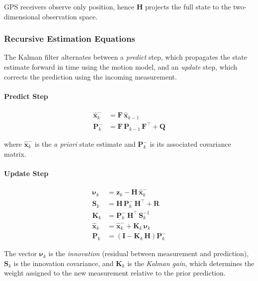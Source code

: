 \documentclass[12pt, a4paper]{article}
\begin{document}
GPS receivers observe only position, hence $\mathbf{H}$ projects the full
state to the two-dimensional observation space.

\subsubsection{Recursive Estimation Equations}

The Kalman filter alternates between a \emph{predict} step, which propagates
the state estimate forward in time using the motion model, and an \emph{update}
step, which corrects the prediction using the incoming measurement.

\paragraph{Predict Step}

\begin{align}
    \hat{\mathbf{x}}^-_k &= \mathbf{F}\,\hat{\mathbf{x}}_{k-1}
    \label{eq:predict_state} \\
    \mathbf{P}^-_k &= \mathbf{F}\,\mathbf{P}_{k-1}\,\mathbf{F}^\top + \mathbf{Q}
    \label{eq:predict_cov}
\end{align}

\noindent where $\hat{\mathbf{x}}^-_k$ is the \emph{a priori} state estimate
and $\mathbf{P}^-_k$ is its associated covariance matrix.

\paragraph{Update Step}

\begin{align}
    \boldsymbol{\nu}_k &= \mathbf{z}_k - \mathbf{H}\,\hat{\mathbf{x}}^-_k
    \label{eq:innovation} \\
    \mathbf{S}_k &= \mathbf{H}\,\mathbf{P}^-_k\,\mathbf{H}^\top + \mathbf{R}
    \label{eq:innovation_cov} \\
    \mathbf{K}_k &= \mathbf{P}^-_k\,\mathbf{H}^\top\,\mathbf{S}_k^{-1}
    \label{eq:kalman_gain} \\
    \hat{\mathbf{x}}_k &= \hat{\mathbf{x}}^-_k + \mathbf{K}_k\,\boldsymbol{\nu}_k
    \label{eq:update_state} \\
    \mathbf{P}_k &= \left(\mathbf{I} - \mathbf{K}_k\,\mathbf{H}\right)\mathbf{P}^-_k
    \label{eq:update_cov}
\end{align}

\noindent The vector $\boldsymbol{\nu}_k$ is the \emph{innovation} (residual
between measurement and prediction), $\mathbf{S}_k$ is the innovation
covariance, and $\mathbf{K}_k$ is the \emph{Kalman gain}, which determines
the weight assigned to the new measurement relative to the prior prediction.
\end{document}
